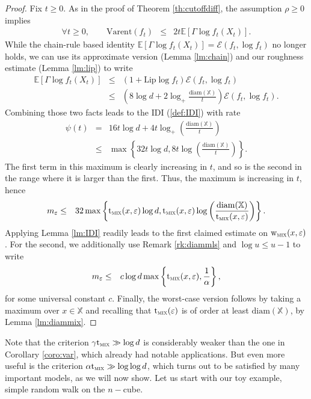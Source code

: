 \documentclass[12pt,final]{article}
\numberwithin{equation}{section}
\newcommand{\Lip}{\mathrm {Lip}}
\newcommand{\EE}{{\mathbb{E}}}
\newcommand{\Varent}{\mathrm{Varent}}
\newcommand{\cE}{\mathscr {E}}
\newcommand{\dX}{\mathbb{X}}
\newcommand{\tmix}{{\rm t}_{\textsc{mix}}}
\newcommand{\wmix}{{\rm w}_{\textsc{mix}}}
\newcommand{\diam}{\mathrm{diam}}
\begin{document}
\begin{proof}Fix $t\ge 0$. As in the proof of Theorem \ref{th:cutoffdiff}, the assumption $\rho\ge 0$ implies 
\begin{eqnarray*}
\forall t\ge 0,\qquad \Varent(f_t) & \le & 2t\EE[\Gamma\log f_t(X_t)].
\end{eqnarray*}
While the chain-rule based identity $\EE\left[\Gamma \log f_t(X_t)\right] = \cE(f_t,\log f_t)$ no longer holds, we can use its approximate version (Lemma \ref{lm:chain}) and our roughness estimate (Lemma \ref{lm:lip}) to write
\begin{eqnarray*}
\EE\left[\Gamma \log f_t(X_t)\right] & \le & (1+\Lip\log f_t)\cE(f_t,\log f_t)\\
& \le & \left(8\log d+2\log_+\frac{\diam(\dX)}{t}\right)\cE(f_t,\log f_t).
\end{eqnarray*}
Combining those two facts leads to the IDI (\ref{def:IDI}) with  rate
\begin{eqnarray*}
\psi(t) & = &  16t\log d+4t\log_+\left(\frac{\diam(\dX)}{t}\right)\\
& \le & \max\left\{32t\log d,8t\log\left(\frac{\diam(\dX)}{t}\right)\right\}.
\end{eqnarray*}
The first term in this maximum is clearly increasing in $t$, and so is the second in the range where it is larger than the first. Thus, the maximum is increasing in $t$, hence 
\begin{eqnarray*}
m_\varepsilon & \le & 32\max\left\{\tmix(x,\varepsilon)\log d, \tmix(x,\varepsilon)\log\left(\frac{\diam(\dX)}{\tmix(x,\varepsilon)}\right)\right\}.
\end{eqnarray*}
Applying Lemma \ref{lm:IDI} readily leads to the first claimed estimate on $\wmix(x,\varepsilon)$. For the second, we additionally use Remark \ref{rk:diammls} and $\log u\le u-1$ to write
\begin{eqnarray*}
m_\varepsilon & \le & c\log d\max\left\{\tmix(x,\varepsilon), \frac{1}{\alpha}\right\},
\end{eqnarray*}
for some universal constant $c$. Finally, the worst-case version follows by taking a maximum over  $x\in\dX$ and recalling that $\tmix(\varepsilon)$ is of order at least  $\diam(\dX)$, by Lemma \ref{lm:diammix}. 
\end{proof}
Note that the criterion $\gamma\tmix\gg\log d$ is considerably weaker than the one in  Corollary \ref{coro:var}, which already had notable applications. But even more useful is the criterion  $\alpha\tmix\gg\log\log d$, which turns out to be satisfied by many important models, as we will now show. Let us start with our  toy example, simple random walk on the $n-$cube.
\end{document}
